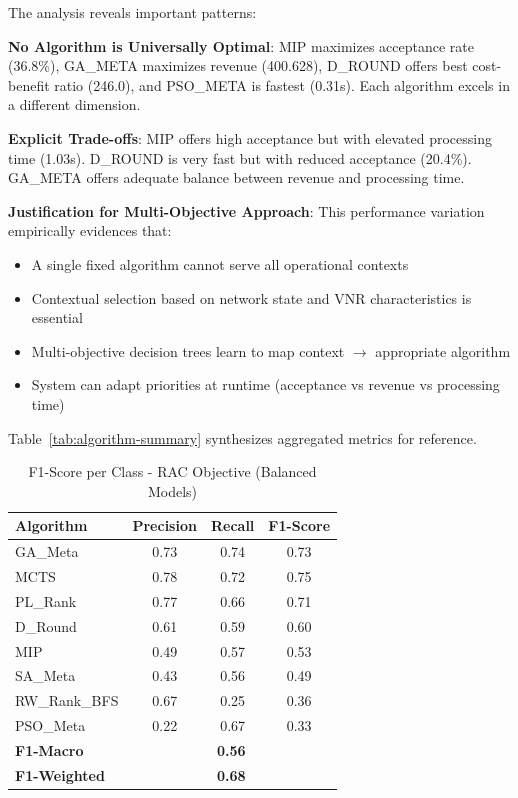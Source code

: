 \documentclass[conference]{IEEEtran}
\begin{document}
The analysis reveals important patterns:

\textbf{No Algorithm is Universally Optimal}: MIP maximizes acceptance rate (36.8\%), GA\_META maximizes revenue (400.628), D\_ROUND offers best cost-benefit ratio (246.0), and PSO\_META is fastest (0.31s). Each algorithm excels in a different dimension.

\textbf{Explicit Trade-offs}: MIP offers high acceptance but with elevated processing time (1.03s). D\_ROUND is very fast but with reduced acceptance (20.4\%). GA\_META offers adequate balance between revenue and processing time.

\textbf{Justification for Multi-Objective Approach}: This performance variation empirically evidences that:
\begin{itemize}
    \item A single fixed algorithm cannot serve all operational contexts
    \item Contextual selection based on network state and VNR characteristics is essential
    \item Multi-objective decision trees learn to map context $\rightarrow$ appropriate algorithm
    \item System can adapt priorities at runtime (acceptance vs revenue vs processing time)
\end{itemize}

Table~\ref{tab:algorithm-summary} synthesizes aggregated metrics for reference.

\begin{table}[H]
\centering
\caption{F1-Score per Class - RAC Objective (Balanced Models)}
\label{tab:f1-per-class}
\begin{tabular}{lccc}
\toprule
\textbf{Algorithm} & \textbf{Precision} & \textbf{Recall} & \textbf{F1-Score} \\
\midrule
GA\_Meta & 0.73 & 0.74 & 0.73 \\
MCTS & 0.78 & 0.72 & 0.75 \\
PL\_Rank & 0.77 & 0.66 & 0.71 \\
D\_Round & 0.61 & 0.59 & 0.60 \\
MIP & 0.49 & 0.57 & 0.53 \\
SA\_Meta & 0.43 & 0.56 & 0.49 \\
RW\_Rank\_BFS & 0.67 & 0.25 & 0.36 \\
PSO\_Meta & 0.22 & 0.67 & 0.33 \\
\midrule
\textbf{F1-Macro} & \multicolumn{3}{c}{\textbf{0.56}} \\
\textbf{F1-Weighted} & \multicolumn{3}{c}{\textbf{0.68}} \\
\bottomrule
\end{tabular}
\end{table}
\end{document}
